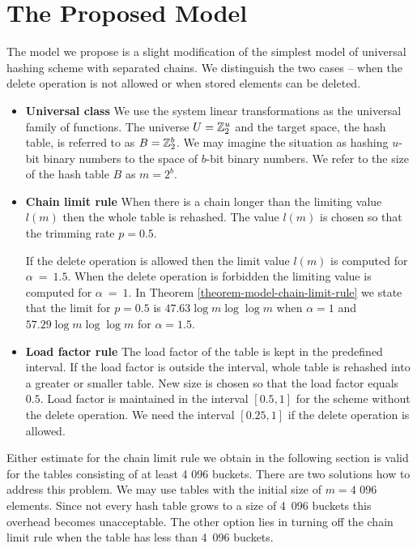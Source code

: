 \section{The Proposed Model}
\label{section-hashing-linear-transformations}
The model we propose is a slight modification of the simplest model of universal hashing scheme with separated chains. We distinguish the two cases -- when the delete operation is not allowed or when stored elements can be deleted.
\begin{itemize}
\item \textbf{Universal class} We use the system linear transformations as the universal family of  functions. The universe $U = \mathbb{Z}_{2}^{u}$ and the target space, the hash table, is referred to as $B = \mathbb{Z}_{2}^{b}$. We may imagine the situation as hashing $u$-bit binary numbers to the space of $b$-bit binary numbers. We refer to the size of the hash table $B$ as $m = 2 ^ b$.

\item \textbf{Chain limit rule} When there is a chain longer than the limiting value $l(m)$ then the whole table is rehashed. The value $l(m)$ is chosen so that the trimming rate $p = 0.5$.

If the delete operation is allowed then the limit value $l(m)$ is computed for $\alpha~=~1.5$. When the delete operation is forbidden the limiting value is computed for $\alpha~=~1$. In Theorem \ref{theorem-model-chain-limit-rule} we state that the limit for $p = 0.5$ is $47.63 \log m \log \log m$ when $\alpha = 1$ and $57.29 \log m \log \log m$ for $\alpha = 1.5$.

\item \textbf{Load factor rule} The load factor of the table is kept in the predefined interval. If the load factor is outside the interval, whole table is rehashed into a greater or smaller table. New size is chosen so that the load factor equals $0.5$. Load factor is maintained in the interval $\left[0.5, 1\right]$ for the scheme without the delete operation. We need the interval $\left[0.25, 1\right]$ if the delete operation is allowed.
\end{itemize}

Either estimate for the chain limit rule we obtain in the following section is valid for the tables consisting of at least 4 096 buckets. There are two solutions how to address this problem. We may use tables with the initial size of $m = \text{4~096}$ elements. Since not every hash table grows to a size of 4~096 buckets this overhead becomes unacceptable. The other option lies in turning off the chain limit rule when the table has less than 4~096 buckets. 

